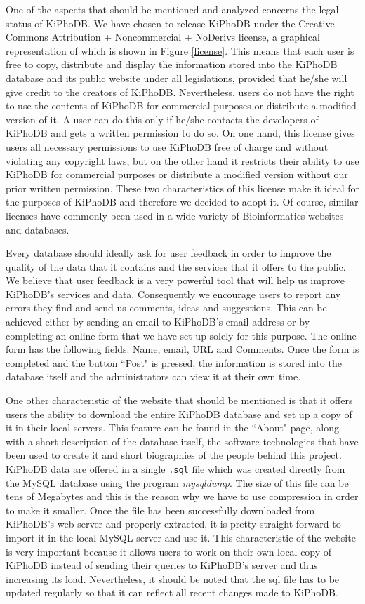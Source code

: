 One of the aspects that should be mentioned and analyzed concerns the legal status of KiPhoDB.
We have chosen to release KiPhoDB under the Creative Commons Attribution + Noncommercial + NoDerivs license, a graphical representation of which is shown in Figure \ref{license}.
This means that each user is free to copy, distribute and display the information stored into the KiPhoDB database and its public website under all legislations, provided that he/she will give credit to the creators of KiPhoDB.
Nevertheless, users do not have the right to use the contents of KiPhoDB for commercial purposes or distribute a modified version of it.
A user can do this only if he/she contacts the developers of KiPhoDB and gets a written permission to do so.
On one hand, this license gives users all necessary permissions to use KiPhoDB free of charge and without violating any copyright laws, but on the other hand it restricts their ability to use KiPhoDB for commercial purposes or distribute a modified version without our prior written permission.
These two characteristics of this license make it ideal for the purposes of KiPhoDB and therefore we decided to adopt it.
Of course, similar licenses have commonly been used in a wide variety of Bioinformatics websites and databases.

Every database should ideally ask for user feedback in order to improve the quality of the data that it contains and the services that it offers to the public.
We believe that user feedback is a very powerful tool that will help us improve KiPhoDB's services and data.
Consequently we encourage users to report any errors they find and send us comments, ideas and suggestions.
This can be achieved either by sending an email to KiPhoDB's email address or by completing an online form that we have set up solely for this purpose.
The online form has the following fields: Name, email, URL and Comments.
Once the form is completed and the button ``Post" is pressed, the information is stored into the database itself and the administrators can view it at their own time.

One other characteristic of the website that should be mentioned is that it offers users the ability to download the entire KiPhoDB database and set up a copy of it in their local servers.
This feature can be found in the ``About" page, along with a short description of the database itself, the software technologies that have been used to create it and short biographies of the people behind this project.
KiPhoDB data are offered in a single \verb+.sql+ file which was created directly from the MySQL database using the program \emph{mysqldump}.
The size of this file can be tens of Megabytes and this is the reason why we have to use compression in order to make it smaller.
Once the file has been successfully downloaded from KiPhoDB's web server and properly extracted, it is pretty straight-forward to import it in the local MySQL server and use it.
This characteristic of the website is very important because it allows users to work on their own local copy of KiPhoDB instead of sending their queries to KiPhoDB's server and thus increasing its load.
Nevertheless, it should be noted that the sql file has to be updated regularly so that it can reflect all recent changes made to KiPhoDB.

